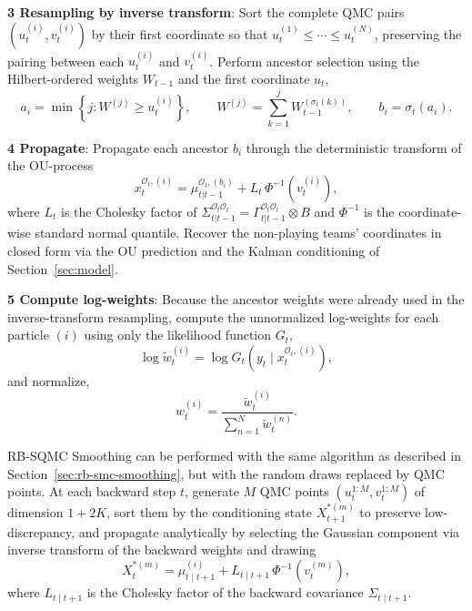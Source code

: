 
\textbf{3 Resampling by inverse transform}: Sort the complete QMC pairs $(u_t^{(i)}, v_t^{(i)})$ by their first coordinate so that $u_t^{(1)} \le \cdots \le u_t^{(N)}$, preserving the pairing between each $u_t^{(i)}$ and $v_t^{(i)}$. Perform ancestor selection using the Hilbert-ordered weights $W_{t-1}$ and the first coordinate $u_t$,
\begin{equation}
    a_i = \min \left\{ j : W^{(j)} \ge u_t^{(i)} \right\}, \qquad W^{(j)} = \sum_{k=1}^{j} W_{t-1}^{(\sigma_t(k))}, \qquad b_i = \sigma_t(a_i). \nonumber
\end{equation}

\textbf{4 Propagate}: Propagate each ancestor $b_i$ through the deterministic transform of the OU-process
\begin{equation}
    x_t^{\mathcal{O}_t,(i)} = \mu_{t|t-1}^{\mathcal{O}_t,(b_i)} + L_t\, \Phi^{-1}\left( v_t^{(i)} \right), \nonumber
\end{equation}
where $L_t$ is the Cholesky factor of $\Sigma_{t|t-1}^{\mathcal{O}_t\mathcal{O}_t} = \Gamma_{t|t-1}^{\mathcal{O}_t\mathcal{O}_t} \otimes B$ and $\Phi^{-1}$ is the coordinate-wise standard normal quantile. Recover the non-playing teams' coordinates in closed form via the OU prediction and the Kalman conditioning of Section~\ref{sec:model}.

\textbf{5 Compute log-weights}: Because the ancestor weights were already used in the inverse-transform resampling, compute the unnormalized log-weights for each particle $(i)$ using only the likelihood function $G_t$,
\begin{equation}
    \log \tilde{w}_t^{(i)} = \log G_t\left( y_t \mid x_t^{\mathcal{O}_t,(i)} \right), \nonumber
\end{equation}
and normalize,
\begin{equation}
    w_t^{(i)} = \frac{\tilde{w}_t^{(i)}}{\sum_{n=1}^N \tilde{w}_t^{(n)}}. \nonumber
\end{equation}

RB-SQMC Smoothing can be performed with the same algorithm as described in Section~\ref{sec:rb-smc-smoothing}, but with the random draws replaced by QMC points. At each backward step $t$, generate $M$ QMC points $(u_t^{1:M}, v_t^{1:M})$ of dimension $1 + 2K$, sort them by the conditioning state $X_{t+1}^{*(m)}$ to preserve low-discrepancy, and propagate analytically by selecting the Gaussian component via inverse transform of the backward weights and drawing
\begin{equation}
    X_t^{*(m)} = \mu_{t \mid t+1}^{(i)} + L_{t \mid t+1}\, \Phi^{-1}\left( v_t^{(m)} \right), \nonumber
\end{equation}
where $L_{t \mid t+1}$ is the Cholesky factor of the backward covariance $\Sigma_{t \mid t+1}$.

